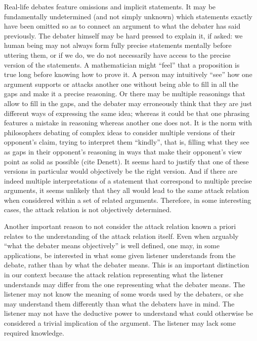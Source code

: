 \documentclass[version=3.21, pagesize, twoside=off, bibliography=totoc, DIV=calc, fontsize=12pt, a4paper, french, english]{scrartcl}
\begin{document}
Real-life debates feature omissions and implicit statements. It may be fundamentally undetermined (and not simply unknown) which statements exactly have been omitted so as to connect an argument to what the debater has said previously. The debater himself may be hard pressed to explain it, if asked: we human being may not always form fully precise statements mentally before uttering them, or if we do, we do not necessarily have access to the precise version of the statements. A mathematician might “feel” that a proposition is true long before knowing how to prove it. A person may intuitively “see” how one argument supports or attacks another one without being able to fill in all the gaps and make it a precise reasoning. Or there may be multiple reasonings that allow to fill in the gaps, and the debater may erroneously think that they are just different ways of expressing the same idea; whereas it could be that one phrasing features a mistake in reasoning whereas another one does not. It is the norm with philosophers debating of complex ideas to consider multiple versions of their opponent’s claim, trying to interpret them “kindly”, that is, filling what they see as gaps in their opponent’s reasoning in ways that make their opponent’s view point as solid as possible (cite Denett). It seems hard to justify that one of these versions in particular would objectively be the right version. And if there are indeed multiple interpretations of a statement that correspond to multiple precise arguments, it seems unlikely that they all would lead to the same attack relation when considered within a set of related arguments. Therefore, in some interesting cases, the attack relation is not objectively determined.

Another important reason to not consider the attack relation known a priori relates to the understanding of the attack relation itself. 
Even when arguably “what the debater means objectively” is well defined, one may, in some applications, be interested in what some given listener understands from the debate, rather than by what the debater means. 
This is an important distinction in our context because the attack relation representing what the listener understands may differ from the one representing what the debater means.
The listener may not know the meaning of some words used by the debaters, or she may understand them differently than what the debaters have in mind. 
The listener may not have the deductive power to understand what could otherwise be considered a trivial implication of the argument. 
The listener may lack some required knowledge.
\end{document}
